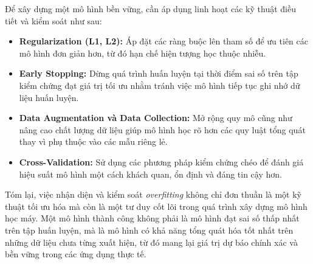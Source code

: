 Để xây dựng một mô hình bền vững, cần áp dụng linh hoạt các kỹ thuật điều tiết và kiểm soát như sau:

\begin{itemize}
    \item \textbf{Regularization (L1, L2):} Áp đặt các ràng buộc lên tham số để ưu tiên các mô hình đơn giản hơn, từ đó hạn chế hiện tượng học thuộc nhiễu.
    
    \item \textbf{Early Stopping:} Dừng quá trình huấn luyện tại thời điểm sai số trên tập kiểm chứng đạt giá trị tối ưu nhằm tránh việc mô hình tiếp tục ghi nhớ dữ liệu huấn luyện.
    
    \item \textbf{Data Augmentation và Data Collection:} Mở rộng quy mô cũng như nâng cao chất lượng dữ liệu giúp mô hình học rõ hơn các quy luật tổng quát thay vì phụ thuộc vào các mẫu riêng lẻ.
    
    \item \textbf{Cross-Validation:} Sử dụng các phương pháp kiểm chứng chéo để đánh giá hiệu suất mô hình một cách khách quan, ổn định và đáng tin cậy hơn.
\end{itemize}

Tóm lại, việc nhận diện và kiểm soát \textit{overfitting} không chỉ đơn thuần là một kỹ thuật tối ưu hóa mà còn là một tư duy cốt lõi trong quá trình xây dựng mô hình học máy. Một mô hình thành công không phải là mô hình đạt sai số thấp nhất trên tập huấn luyện, mà là mô hình có khả năng tổng quát hóa tốt nhất trên những dữ liệu chưa từng xuất hiện, từ đó mang lại giá trị dự báo chính xác và bền vững trong các ứng dụng thực tế.
